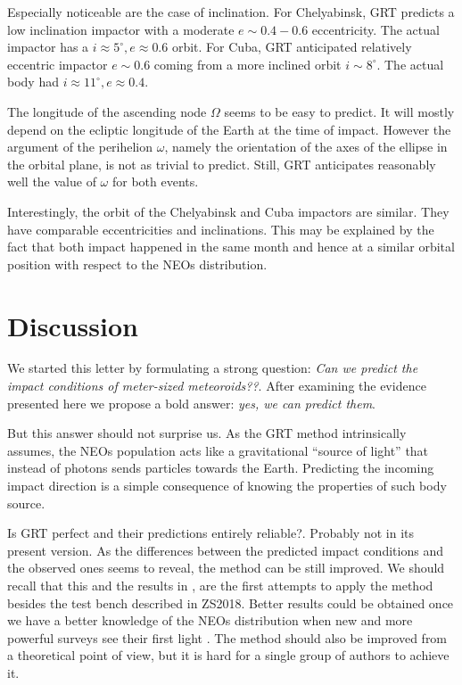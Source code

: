\documentclass[fleqn,usenatbib]{mnras}
\newcommand{\mytitle}{Can we predict the impact conditions of meter-sized meteoroids?}
\begin{document}
Especially noticeable are the case of inclination.  For Chelyabinsk, GRT predicts a low inclination impactor with a moderate $e\sim0.4-0.6$ eccentricity.  The actual impactor has a $i\approx 5^\circ, e\approx 0.6$ orbit.   For Cuba, GRT anticipated relatively eccentric impactor $e\sim 0.6$ coming from a more inclined orbit $i\sim 8^\circ$.  The actual body had $i\approx 11^\circ, e\approx 0.4$.  

The longitude of the ascending node $\Omega$ seems to be easy to predict.  It will mostly depend on the ecliptic longitude of the Earth at the time of impact. However the argument of the perihelion $\omega$, namely the orientation of the axes of the ellipse in the orbital plane, is not as trivial to predict.  Still, GRT anticipates reasonably well the value of $\omega$ for both events.

Interestingly, the orbit of the Chelyabinsk and Cuba impactors are similar.  They have comparable eccentricities and inclinations.  This may be explained by the fact that both impact happened in the same month and hence at a similar orbital position with respect to the NEOs distribution.

\section{Discussion}
\label{sec:discussion}

We started this letter by formulating a strong question: {\it \mytitle?}.  After examining the evidence presented here we propose a bold answer: {\it yes, we can predict them}.  

But this answer should not surprise us.  As the GRT method intrinsically assumes, the NEOs population acts like a gravitational ``source of light'' that instead of photons sends particles towards the Earth.  Predicting the incoming impact direction is a simple consequence of knowing the properties of such body source.

Is GRT perfect and their predictions entirely reliable?. Probably not in its present version. As the differences between the predicted impact conditions and the observed ones seems to reveal, the method can be still improved. We should recall that this and the results in \citet{Zuluaga2019}, are the first attempts to apply the method besides the test bench described in ZS2018.  Better results could be obtained once we have a better knowledge of the NEOs distribution when new and more powerful surveys see their first light \citep{Marshall2017}. The method should also be improved from a theoretical point of view, but it is hard for a single group of authors to achieve it.
\end{document}
